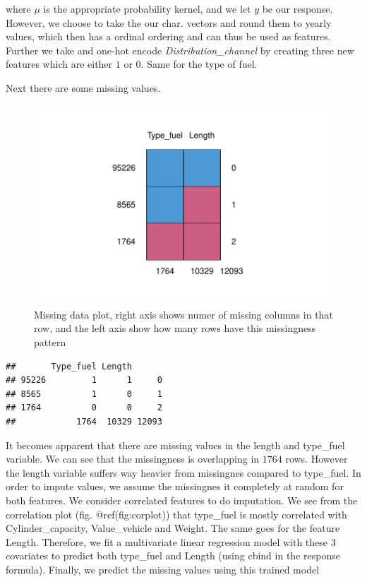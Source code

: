 \documentclass[
]{article}
\begin{document}
where \(\mu\) is the appropriate probability kernel, and we let \(y\) be
our response. However, we choose to take the our char. vectors and round
them to yearly values, which then has a ordinal ordering and can thus be
used as features. Further we take and one-hot encode
\emph{Distribution\_channel} by creating three new features which are
either \(1\) or \(0\). Same for the type of fuel.

Next there are some missing values.

\begin{figure}

{\centering \includegraphics[width=0.5\linewidth]{assignment_uptodat_files/figure-latex/unnamed-chunk-6-1} 

}

\caption{Missing data plot, right axis shows numer of missing columns in that row, and the left axis show how many rows have this missingness pattern}\label{fig:unnamed-chunk-6}
\end{figure}

\begin{verbatim}
##       Type_fuel Length      
## 95226         1      1     0
## 8565          1      0     1
## 1764          0      0     2
##            1764  10329 12093
\end{verbatim}

It becomes apparent that there are missing values in the length and
type\_fuel variable. We can see that the missingness is overlapping in
\(1764\) rows. However the length variable suffers way heavier from
missingnes compared to type\_fuel. In order to impute values, we assume
the missingnes it completely at random for both features. We consider
correlated features to do imputation. We see from the correlation plot
(fig. @ref(fig:corplot)) that type\_fuel is mostly correlated with
Cylinder\_capacity, Value\_vehicle and Weight. The same goes for the
feature Length. Therefore, we fit a multivariate linear regression model
with these 3 covariates to predict both type\_fuel and Length (using
cbind in the response formula). Finally, we predict the missing values
using this trained model
\end{document}
